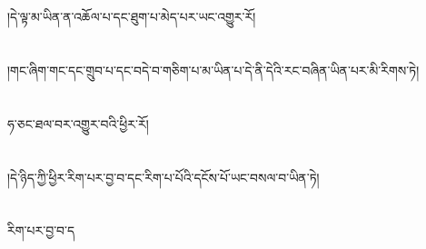 \chapter{ }།དེ་ལྟ་མ་ཡིན་ན་འཆོལ་པ་དང་ཐུག་པ་མེད་པར་ཡང་འགྱུར་རོ།\chapter{ }།གང་ཞིག་གང་དང་གྲུབ་པ་དང་བདེ་བ་གཅིག་པ་མ་ཡིན་པ་དེ་ནི་དེའི་རང་བཞིན་ཡིན་པར་མི་རིགས་ཏེ།\chapter{ }ཧ་ཅང་ཐལ་བར་འགྱུར་བའི་ཕྱིར་རོ།\chapter{ }།དེ་ཉིད་ཀྱི་ཕྱིར་རིག་པར་བྱ་བ་དང་རིག་པ་པོའི་དངོས་པོ་ཡང་བསལ་བ་ཡིན་ཏེ།\chapter{ }རིག་པར་བྱ་བ་ད